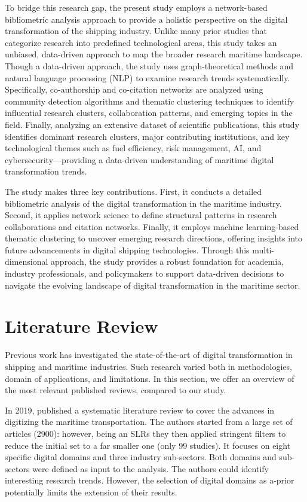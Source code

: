 \documentclass[jmse,review,submit,pdftex,moreauthors]{Definitions/mdpi}
\begin{document}
To bridge this research gap, the present study employs a network-based bibliometric analysis approach to provide a holistic perspective on the digital transformation of the shipping industry. Unlike many prior studies that categorize research into predefined technological areas, this study takes an unbiased, data-driven approach to map the broader research maritime landscape. Though a data-driven approach, the study uses graph-theoretical methods and natural language processing (NLP) to examine research trends systematically. Specifically, co-authorship and co-citation networks are analyzed using community detection algorithms and thematic clustering techniques to identify influential research clusters, collaboration patterns, and emerging topics in the field. Finally, analyzing an extensive dataset of scientific publications, this study identifies dominant research clusters, major contributing institutions, and key technological themes such as fuel efficiency, risk management, AI, and cybersecurity—providing a data-driven understanding of maritime digital transformation trends.

The study makes three key contributions. First, it conducts a detailed bibliometric analysis of the digital transformation in the maritime industry. Second, it applies network science to define structural patterns in research collaborations and citation networks. Finally, it employs machine learning-based thematic clustering to uncover emerging research directions, offering insights into future advancements in digital shipping technologies. Through this multi-dimensional approach, the study provides a robust foundation for academia, industry professionals, and policymakers to support data-driven decisions to navigate the evolving landscape of digital transformation in the maritime sector.

\section{Literature Review}
Previous work has investigated the state-of-the-art of digital transformation in shipping and maritime industries. Such research varied both in methodologies, domain of applications, and limitations. In this section, we offer an overview of the most relevant published reviews, compared to our study.

In 2019, \citep{sanchez2019toward} published a systematic literature review to cover the advances in digitizing the maritime transportation. The authors started from a large set of articles (2900): however, being an SLRs they then applied stringent filters to reduce the initial set to a far smaller one (only 99 studies). It focuses on eight specific digital domains and three industry sub-sectors. Both domains and sub-sectors were defined as input to the analysis. The authors could identify interesting research trends. However, the selection of digital domains as a-prior potentially limits the extension of their results.
\end{document}
